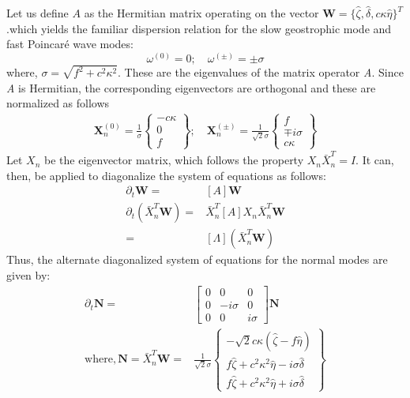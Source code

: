 Let us define $A$ as the Hermitian matrix operating on the vector 
$\mathbf{W} = \{\hat{\zeta}, \hat{\delta} ,c\kappa \hat{\eta} \}^T $.which 
yields the 
familiar dispersion relation 
for the slow geostrophic mode 
and fast Poincar\'e wave modes:
\begin{equation}
 \omega^{(0)} = 0;\quad \omega^{(\pm)}=\pm \sigma
\end{equation}
where, $\sigma = \sqrt{f^2 + c^2\kappa^2 }$. These are the eigenvalues of 
the matrix operator \emph{A}. Since \emph{A} is Hermitian, the corresponding 
eigenvectors are orthogonal and these are normalized as follows
\begin{align}
  \mathbf X^{(0)}_n = 
    \frac{1}{\sigma}
    \begin{Bmatrix}
       -c\kappa \\ 0 \\ f
     \end{Bmatrix}; \quad
  \mathbf X^{(\pm)}_n = 
    \frac{1}{\sqrt{2} \sigma}
    \begin{Bmatrix}
       f \\ \mp i\sigma \\ c\kappa
     \end{Bmatrix}
\end{align}
Let $X_n$ be the eigenvector matrix, which follows the 
property $X_n \bar{X}_n^{T}=I$. It can, then, be applied to diagonalize the 
system of 
equations as follows:
\begin{align}
 \partial_t \mathbf{W} =& [A] \mathbf{W}\\
 \partial_t (\bar{X}_n^T \mathbf{W}) =& \bar{X}_n^T[A]X_n 
\bar{X}_n^T\mathbf{W}\\
			    =& [\Lambda] (\bar{X}_n^T\mathbf{W})
\end{align}
Thus, the alternate diagonalized system of equations for the normal modes are 
given by:
\begin{align}
 \partial_t
\mathbf{N}
  = &
  \begin{bmatrix}
     0 & 0 & 0 \\
     0 & -i\sigma & 0 \\
     0 & 0 & i\sigma 
  \end{bmatrix}
  \mathbf{N}\\
\text{where},
   \mathbf{N} = \bar{X}_n^T \mathbf{W}
   = &\frac{1}{\sqrt{2}\sigma}
   \begin{Bmatrix}
       -\sqrt{2}c\kappa(\hat{\zeta} -f \hat{\eta}) \\ 
        f\hat{\zeta} + c^2\kappa^2\hat{\eta} - i\sigma\hat{\delta} \\
       f\hat{\zeta} + c^2\kappa^2\hat{\eta} + i\sigma\hat{\delta}
   \end{Bmatrix}
\end{align}

